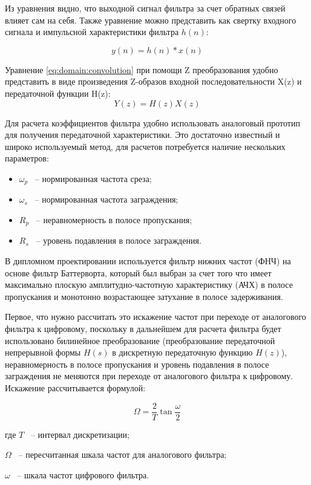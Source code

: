 Из уравнения видно, что выходной сигнал фильтра за счет обратных связей влияет сам на себя. 
Также уравнение можно представить как свертку входного сигнала и импульсной характеристики фильтра $h(n)$:

\begin{equation}
    \label{eq:domain:convolution}
    y(n) = h(n) \ast  x(n)
    \end{equation}

Уравнение \ref{eq:domain:convolution} при помощи Z преобразования удобно представить в виде произведения Z-образов входной последовательности X(z) и передаточной функции H(z):
\begin{equation}
    \label{eq:domain:Zconvolution}
    Y(z) = H(z)X(z)
    \end{equation}

Для расчета коэффициентов фильтра удобно использовать аналоговый прототип для получения передаточной характеристики. 
Это достаточно известный и широко используемый метод, для расчетов потребуется наличие нескольких параметров:

\begin{itemize}
    \item $\omega_{p}$ ~-- нормированная частота среза;
    \item $\omega_{s}$ ~-- нормированная частота заграждения;
    \item $R_{p}$ ~-- неравномерность в полосе пропускания;
    \item $R_{s}$ ~-- уровень подавления в полосе заграждения.
\end{itemize}

В дипломном проектировании используется фильтр нижних частот (ФНЧ) на основе фильтр Баттерворта, 
который был выбран за счет того что имеет максимально плоскую амплитудно-частотную характеристику
(АЧХ) в полосе пропускания и монотонно возрастающее затухание в полосе задерживания.

Первое, что нужно рассчитать это искажение частот при переходе от аналогового фильтра к цифровому, поскольку в дальнейшем для
расчета фильтра будет использовано билинейное преобразование (преобразование передаточной непрерывной формы $H(s)$ в дискретную передаточную функцию $H(z)$), 
неравномерность в полосе пропускания и уровень подавления в полосе 
заграждения не меняются при переходе от аналогового фильтра к цифровому. 
Искажение рассчитывается формулой:

\begin{equation}
    \label{eq:domain:Omega}
    \Omega=\frac{2}{T}\tan{\frac{\omega}{2}}
    \end{equation}
    \begin{explanationx}
        \item[где] $T$ ~-- интервал дискретизации;
        \item      $\Omega$ ~-- пересчитанная шкала частот для аналогового фильтра;
        \item      $\omega$ ~-- шкала частот цифрового фильтра.
      \end{explanationx} 

